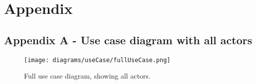 \section{Appendix}

  \begin{landscape}
    \subsection{Appendix A - Use case diagram with all actors}
      \begin{figure}[H]
        \centering
        \texttt{[image: diagrams/useCase/fullUseCase.png]}
        \caption{Full use case diagram, showing all actors.}
        \label{fig:UCfull}
      \end{figure}
  \end{landscape}
